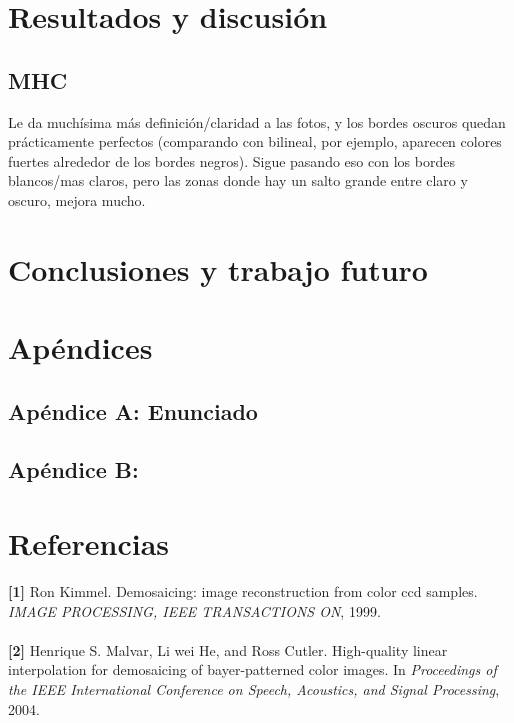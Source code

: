 \documentclass[a4paper]{article}
\begin{document}
\newpage
\section{Resultados y discusi\'on}
\subsection{MHC}
Le da muchísima más definición/claridad a las fotos, y los bordes oscuros quedan prácticamente perfectos (comparando con bilineal, por ejemplo, aparecen colores fuertes alrededor de los bordes negros). Sigue pasando eso con los bordes blancos/mas claros, pero las zonas donde hay un salto grande entre claro y oscuro, mejora mucho.

\newpage
\section{Conclusiones y trabajo futuro}





\section{Ap\'endices}
\subsection{Ap\'endice A: Enunciado} 


\subsection{Ap\'endice B:}
\newpage
\section{Referencias}
 
\textbf{[1]} Ron Kimmel. Demosaicing: image reconstruction from color ccd samples. \textit{IMAGE PROCESSING, IEEE TRANSACTIONS ON}, 1999. \\
\\

\textbf{[2]} Henrique S. Malvar, Li wei He, and Ross Cutler. High-quality linear interpolation for
demosaicing of bayer-patterned color images. In \textit{Proceedings of the IEEE International
Conference on Speech, Acoustics, and Signal Processing}, 2004.
\end{document}
